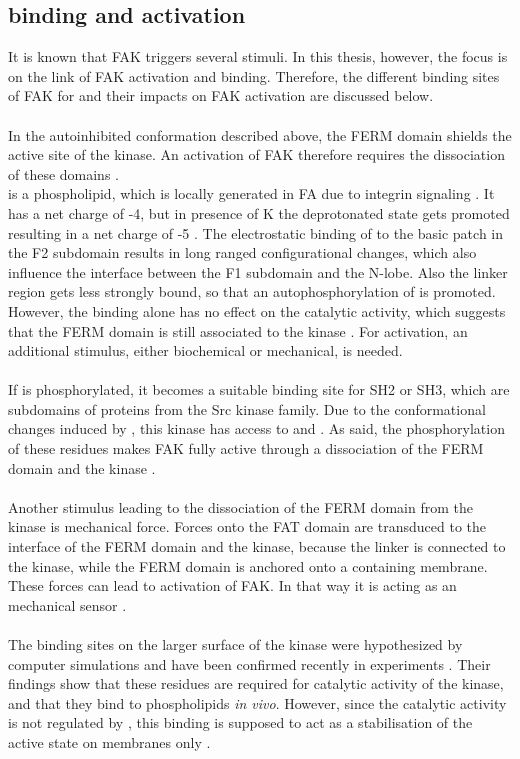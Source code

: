 \subsection{\pip{} binding and activation}
It is known that FAK triggers several stimuli. In this thesis, however, the focus is on the link of FAK activation and \pip{} binding. Therefore, the different binding sites of FAK for \pip{} and their impacts on FAK activation are discussed below.\\
\\
In the autoinhibited conformation described above, the FERM domain shields the active site of the kinase. An activation of FAK therefore requires the dissociation of these domains \autocite{structFAK}.\\
\pip{} is a phospholipid, which is locally generated in FA due to integrin signaling \autocite{CIT34}. 
It has a net charge of -4, but in presence of K the deprotonated state gets promoted resulting in a net charge of -5 \autocite{pip2_minus5}. The electrostatic binding of \pip{} to the basic patch in the F2 subdomain results in long ranged configurational changes, which also influence the interface between the F1 subdomain and the N-lobe. Also the linker region gets less strongly bound, so that an autophosphorylation of  is promoted. However, the \pip{} binding alone has no effect on the catalytic activity, which suggests that the FERM domain is still associated to the kinase \autocites{pap001}{pap003}. For activation, an additional stimulus, either biochemical or mechanical, is needed.\\
\\
If  is phosphorylated, it becomes a suitable binding site for SH2 or SH3, which are subdomains of proteins from the Src kinase family. Due to the conformational changes induced by \pip{}, this kinase has access to  and . As said, the phosphorylation of these residues makes FAK fully active through a dissociation of the FERM domain and the kinase \autocite{pap001}.\\
\\
Another stimulus leading to the dissociation of the FERM domain from the kinase is mechanical force. Forces onto the FAT domain are transduced to the interface of the FERM domain and the kinase, because the linker is connected to the kinase, while the FERM domain is anchored onto a \pip{} containing membrane. These forces can lead to activation of FAK. In that way it is acting as an mechanical sensor \autocite{pap004}.\\
\\
The binding sites on the larger surface of the kinase were hypothesized by computer simulations \autocite{pap002} and have been confirmed recently in experiments \autocite{pap002Exp}. Their findings show that these residues are required for catalytic activity of the kinase, and that they bind to phospholipids \textit{in vivo}. However, since the catalytic activity is not regulated by \pip{}, this binding is supposed to act as a stabilisation of the active state on membranes only \autocite{pap002Exp}.

